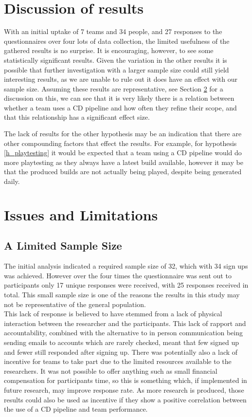 \documentclass[journal]{IEEEtran}
\begin{document}
\section{Discussion of results}
    With an initial uptake of 7 teams and 34 people, and 27 responses to the questionnaires over four lots of data collection, the limited usefulness of the gathered results is no surprise. It is encouraging, however, to see some statistically significant results. Given the variation in the other results it is possible that further investigation with a larger sample size could still yield interesting results, as we are unable to rule out it does have an effect with our sample size. Assuming these results are representative, see Section \ref{IssuesandLimitations} for a discussion on this, we can see that it is very likely there is a relation between whether a team uses a CD pipeline and how often they refine their scope, and that this relationship has a significant effect size.

    The lack of results for the other hypothesis may be an indication that there are other compounding factors that effect the results. For example, for hypothesis \ref{h_playtesting} it would be expected that a team using a CD pipeline would do more playtesting as they always have a latest build available, however it may be that the produced builds are not actually being played, despite being generated daily.

\section{Issues and Limitations} \label{IssuesandLimitations}
    \subsection{A Limited Sample Size}
        The initial analysis indicated a required sample size of 32, which with 34 sign ups was achieved. However over the four times the questionnaire was sent out to participants only 17 unique responses were received, with 25 responses received in total. This small sample size is one of the reasons the results in this study may not be representative of the general population. \\

        This lack of response is believed to have stemmed from a lack of physical interaction between the researcher and the participants. This lack of rapport and accountability, combined with the alternative to in person communication being sending emails to accounts which are rarely checked, meant that few signed up and fewer still responded after signing up. There was potentially also a lack of incentive for teams to take part due to the limited resources available to the researchers. It was not possible to offer anything such as small financial compensation for participants time, so this is something which, if implemented in future research, may improve response rate. As more research is produced, those results could also be used as incentive if they show a positive correlation between the use of a CD pipeline and team performance.
\end{document}
